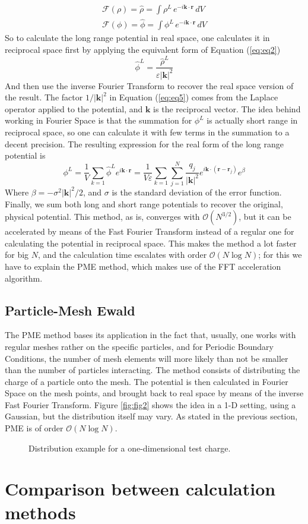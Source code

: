 \documentclass[a4paper, 12pt, notitlepage]{article}
\begin{document}
\begin{gather*}
	\mathcal{F} (\rho) = \hat{\rho} = \int\rho^L\, e^{-i\mathbf{k}\cdot\mathbf{r}}\, dV\\
	\mathcal{F} (\phi) = \hat{\phi} = \int\phi^L \, e^{-i\mathbf{k}\cdot\mathbf{r}}\, dV
\end{gather*}
So to calculate the long range potential in real space, one calculates it in reciprocal space first by applying the equivalent form of Equation (\ref{eq:eq2})
\begin{equation}
	\hat{\phi}^L = \frac{\hat{\rho}^L}{\varepsilon |\mathbf{k}|^2}\label{eq:eq5}
\end{equation}
And then use the inverse Fourier Transform to recover the real space version of the result. The factor $1/|\mathbf{k}|^2$ in Equation (\ref{eq:eq5}) comes from the Laplace operator applied to the potential, and $\mathbf{k}$ is  the reciprocal vector. The idea behind working in Fourier Space is that the summation for $\phi^L$ is actually short range in reciprocal space, so one can calculate it with few terms in the summation to a decent precision. The resulting expression for the real form of the long range potential is
\begin{equation}
	\phi^L = \frac{1}{V}\sum_{k=1}\hat{\phi}^L e^{i\mathbf{k}\cdot\mathbf{r}}= \frac{1}{V\varepsilon}\sum_{k = 1}\sum_{j = 1}^N \frac{q_j}{|\mathbf{k}|^2}e^{i\mathbf{k}\cdot(\mathbf{r} - \mathbf{r}_j)}e^{\beta}\label{eq:eq6}
\end{equation}
Where $\beta = -\sigma^2|\mathbf{k}|^2/2$, and $\sigma$ is the standard deviation of the error function.
Finally, we sum both long and short range potentials to recover the original, physical potential. This method, as is, converges with $\mathcal{O}(N^{3/2})$, but it can be accelerated by means of the Fast Fourier Transform instead of a regular one for calculating the potential in reciprocal space. This makes the method a lot faster for big $N$, and the calculation time escalates with order $\mathcal{O}(N\log N)$; for this we have to explain the PME method, which makes use of the FFT acceleration algorithm.
\subsection{Particle-Mesh Ewald}
The PME method bases its application in the fact that, usually, one works with regular meshes rather on the specific particles, and for Periodic Boundary Conditions, the number of mesh elements will more likely than not be smaller than the number of particles interacting. The method consists of distributing the charge of a particle onto the mesh. The potential is then calculated in Fourier Space on the mesh points, and brought back to real space by means of the inverse Fast Fourier Transform. Figure \ref{fig:fig2} shows the idea in a 1-D setting, using a Gaussian, but the distribution itself may vary. As stated in the previous section, PME is of order $\mathcal{O}(N\log N)$.
\begin{figure}
	\centering
	
	\caption{Distribution example for a one-dimensional test charge.}
\end{figure}
\section*{Comparison between calculation methods}
\end{document}
